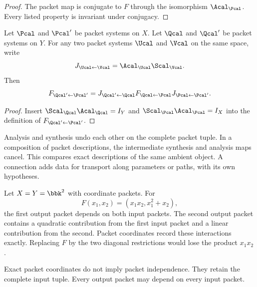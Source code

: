\begin{proof}
The packet map is conjugate to $F$ through the isomorphism $\Acal_{\Pcal}$.  Every listed property is invariant under conjugacy.
\end{proof}

\begin{proposition}\label{prop:change_packet_coordinates}
Let $\Pcal$ and $\Pcal'$ be packet systems on $X$.  Let $\Qcal$ and $\Qcal'$ be packet systems on $Y$.  For any two packet systems $\Ucal$ and $\Vcal$ on the same space, write
\[
J_{\Ucal\leftarrow\Vcal}
=
\Acal_{\Ucal}\Scal_{\Vcal}.
\]
Then
\[
F_{\Qcal'\leftarrow\Pcal'}
=
J_{\Qcal'\leftarrow\Qcal}
F_{\Qcal\leftarrow\Pcal}
J_{\Pcal\leftarrow\Pcal'}.
\]
\end{proposition}

\begin{proof}
Insert $\Scal_{\Qcal}\Acal_{\Qcal}=I_Y$ and $\Scal_{\Pcal}\Acal_{\Pcal}=I_X$ into the definition of $F_{\Qcal'\leftarrow\Pcal'}$.
\end{proof}

\begin{keyidea}[title={Exactness by cancellation}]
Analysis and synthesis undo each other on the complete packet tuple. In a composition of packet descriptions, the intermediate synthesis and analysis maps cancel. This compares exact descriptions of the same ambient object. A connection adds data for transport along parameters or paths, with its own hypotheses.
\end{keyidea}

\begin{example}\label{ex:mixed_quadratic}
Let $X=Y=\bbk^2$ with coordinate packets.  For
\[
F(x_1,x_2)=(x_1x_2,x_1^2+x_2),
\]
the first output packet depends on both input packets.  The second output packet contains a quadratic contribution from the first input packet and a linear contribution from the second.  Packet coordinates record these interactions exactly.  Replacing $F$ by the two diagonal restrictions would lose the product $x_1x_2$.
\end{example}

\begin{remark}\label{rem:coordinates_not_independence}
Exact packet coordinates do not imply packet independence.  They retain the complete input tuple.  Every output packet may depend on every input packet.
\end{remark}

